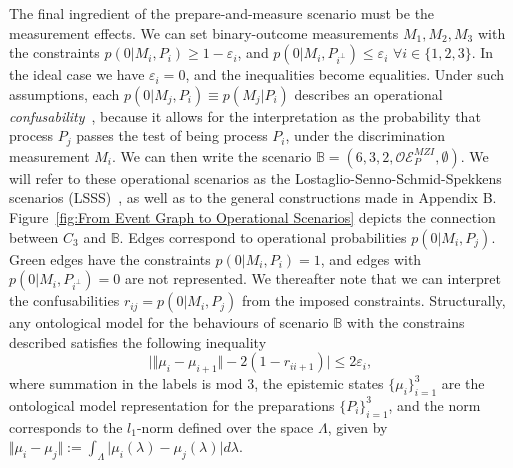 \documentclass[a4paper,twocolumn,11pt,accepted=2024-01-17]{quantumarticle}
\begin{document}
The final ingredient of the prepare-and-measure scenario must be the measurement effects. We can set binary-outcome measurements $M_1, M_2, M_3$ with the constraints $p(0\vert M_i,P_i)\geq 1-\varepsilon_i$, and $p(0 \vert M_i, P_{i^\perp})\leq \varepsilon_i$ $\forall i \in \{1,2,3\}$. In the ideal case we have $\varepsilon_i=0$, and the inequalities become equalities. Under such assumptions, each $p(0\vert M_j,P_i)\equiv p(M_j\vert P_i)$ describes an operational \textit{confusability}~\cite{schmid2018discrimination}, because it allows for the interpretation as the probability that process $P_j$ passes the test of being process $P_i$, under the discrimination measurement $M_i$. We can then write the scenario $\mathbb{B} = (6,3,2,\mathcal{OE}_P^{MZI},\emptyset)$. We will refer to these operational scenarios as the Lostaglio-Senno-Schmid-Spekkens scenarios (LSSS)~\cite{Lostaglio2020contextualadvantage,schmid2018discrimination}, as well as to the general constructions made in Appendix B. Figure~\ref{fig:From Event Graph to Operational Scenarios} depicts the connection between $C_3$ and $\mathbb{B}$. Edges correspond to operational probabilities $p(0 \vert M_i, P_j)$. Green edges have the constraints  $p(0\vert M_i ,P_i)=1$, and edges with $p(0\vert M_i ,P_{i^\perp})=0$ are not represented. We thereafter note that we can interpret the confusabilities $r_{ij} = p(0\vert M_i, P_j)$ from the imposed constraints. Structurally, any ontological model for the behaviours of scenario $\mathbb{B}$ with the constrains described satisfies the following inequality~\cite{Lostaglio2020contextualadvantage}
\begin{equation}\label{eq: LSSS structure}
    \vert \Vert \mu_i - \mu_{i+1}\Vert - 2(1-r_{i i+1}) \vert \leq 2\varepsilon_i ,
\end{equation}
where summation in the labels is mod 3, the epistemic states $\{\mu_i\}_{i=1}^3$ are the ontological model representation for the preparations $\{P_i\}_{i=1}^3$, and the norm corresponds to the $l_1$-norm defined over the space $\Lambda$, given by $\Vert \mu_i - \mu_j \Vert := \int_\Lambda \vert \mu_i(\lambda) - \mu_j(\lambda)\vert d\lambda$. 
\end{document}

